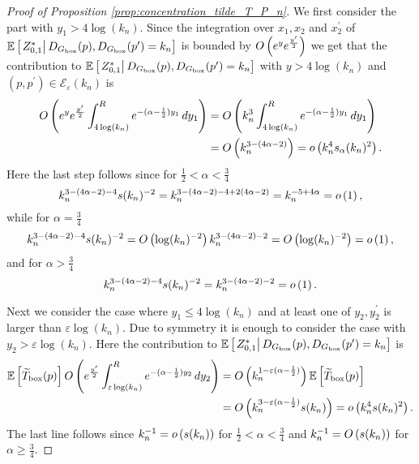 \begin{proof}[Proof of Proposition \ref{prop:concentration_tilde_T_P_n}]
We first consider the part with $y_1 > 4\log(k_n)$. Since the integration over $x_1, x_2$ and $x_2^\prime$ of $\mathbb{E}\left[\left.Z_{0,1}^\ast\right|D_{G_{\mathrm{box}}}(p), D_{G_{\mathrm{box}}}(p^\prime) = k_n\right]$ is bounded by $O\left(e^{y}e^{\frac{y^\prime}{2}}\right)$ we get that the contribution to $\mathbb{E}\left[\left.Z_{0,1}^\ast\right|D_{G_{\mathrm{box}}}(p), D_{G_{\mathrm{box}}}(p^\prime) = k_n\right]$ with $y > 4\log(k_n)$ and $(p,p^\prime) \in \mathcal{E}_\varepsilon(k_n)$ is
\begin{align*}
	O\left(e^{y}e^{\frac{y^\prime}{2}} \int_{4\log(k_n)}^{R} e^{-(\alpha - \frac{1}{2})y_1} \, dy_1\right)
	&= O\left(k_n^3 \int_{4\log(k_n)}^{R} e^{-(\alpha - \frac{1}{2})y_1} \, dy_1\right)\\
	&= O\left(k_n^{3 - (4\alpha - 2)}\right) = o\left(k_n^4 s_\alpha(k_n)^2\right).
\end{align*}
Here the last step follows since for $\frac{1}{2} < \alpha < \frac{3}{4}$
\[
	k_n^{3 - (4\alpha - 2) - 4} s(k_n)^{-2} 
	= k_n^{3 - (4\alpha - 2) - 4 + 2(4\alpha - 2)} = k_n^{-5 + 4\alpha} = o\left(1\right),
\]
while for $\alpha = \frac{3}{4}$
\[
	k_n^{3 - (4\alpha - 2) - 4} s(k_n)^{-2} 
	= O\left(\log(k_n)^{-2}\right) k_n^{3 - (4\alpha - 2) - 2} = O\left(\log(k_n)^{-2}\right) = o\left(1\right),
\]
and for $\alpha > \frac{3}{4}$
\[
	k_n^{3 - (4\alpha - 2) - 4} s(k_n)^{-2} = k_n^{3 - (4\alpha - 2) - 2} = o\left(1\right).
\]

Next we consider the case where $y_1 \le 4\log(k_n)$ and at least one of $y_2, y_2^\prime$ is larger than $\varepsilon \log(k_n)$. Due to symmetry it is enough to consider the case with $y_2 > \varepsilon \log(k_n)$. Here the contribution to $\mathbb{E}\left[\left.Z_{0,1}^\ast\right|D_{G_{\mathrm{box}}}(p), D_{G_{\mathrm{box}}}(p^\prime) = k_n\right]$ is
\begin{align*}
	\mathbb{E}\left[\widetilde{T}_{\text{box}}(p)\right]
		O\left(e^{\frac{y^\prime}{2}}\int_{\varepsilon \log(k_n)}^{R} e^{-(\alpha -\frac{1}{2})y_2} \, dy_2\right)
	&= O\left(k_n^{1 - \varepsilon(\alpha -\frac{1}{2})}\right)\mathbb{E}\left[\widetilde{T}_{\text{box}}(p)\right]\\
	&= O\left(k_n^{3 - \varepsilon(\alpha -\frac{1}{2})} s(k_n)\right) = o\left(k_n^4 s(k_n)^2\right).
\end{align*}
The last line follows since $k_n^{-1} = o\left(s(k_n)\right)$ for $\frac{1}{2} < \alpha < \frac{3}{4}$ and $k_n^{-1} = O\left(s(k_n)\right)$ for $\alpha \ge \frac{3}{4}$. 


\end{proof}
